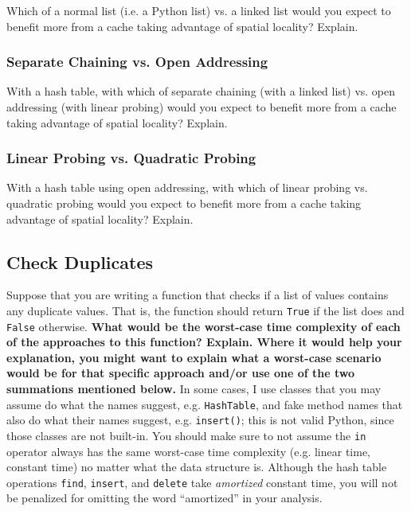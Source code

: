 \documentclass{article}
\begin{document}
Which of a normal list (i.e. a Python list) vs. a linked list would you expect to benefit more from a cache taking advantage of spatial locality? Explain.

\begin{mdframed}
\vspace{3em}
\end{mdframed}

\subsubsection{Separate Chaining vs. Open Addressing}

With a hash table, with which of separate chaining (with a linked list) vs. open addressing (with linear probing) would you expect to benefit more from a cache taking advantage of spatial locality? Explain.

\begin{mdframed}
\vspace{3em}
\end{mdframed}

\subsubsection{Linear Probing vs. Quadratic Probing}

With a hash table using open addressing, with which of linear probing vs. quadratic probing would you expect to benefit more from a cache taking advantage of spatial locality? Explain.

\begin{mdframed}
\vspace{3em}
\end{mdframed}

\subsection{Check Duplicates}

Suppose that you are writing a function that checks if a list of values contains any duplicate values. That is, the function should return \lstinline{True} if the list does and \lstinline{False} otherwise. \textbf{What would be the worst-case time complexity of each of the approaches to this function? Explain. Where it would help your explanation, you might want to explain what a worst-case scenario would be for that specific approach and/or use one of the two summations mentioned below.} In some cases, I use classes that you may assume do what the names suggest, e.g. \lstinline{HashTable}, and fake method names that also do what their names suggest, e.g. \lstinline{insert()}; this is not valid Python, since those classes are not built-in. You should make sure to not assume the \lstinline{in} operator always has the same worst-case time complexity (e.g. linear time, constant time) no matter what the data structure is. Although the hash table operations \lstinline{find}, \lstinline{insert}, and \lstinline{delete} take \textit{amortized} constant time, you will not be penalized for omitting the word ``amortized'' in your analysis.
\end{document}
